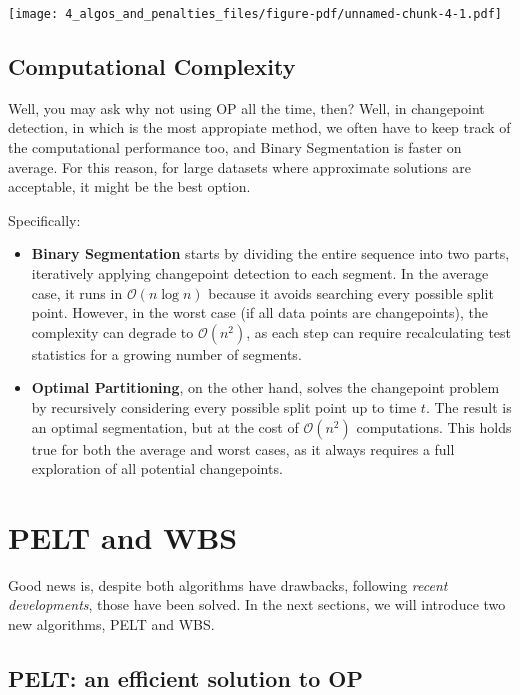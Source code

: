 \documentclass[
  letterpaper,
  DIV=11,
  numbers=noendperiod]{scrreprt}
\begin{document}
\texttt{[image: 4\_algos\_and\_penalties\_files/figure-pdf/unnamed-chunk-4-1.pdf]}

\subsection{Computational Complexity}\label{computational-complexity}

Well, you may ask why not using OP all the time, then? Well, in
changepoint detection, in which is the most appropiate method, we often
have to keep track of the computational performance too, and Binary
Segmentation is faster on average. For this reason, for large datasets
where approximate solutions are acceptable, it might be the best option.

Specifically:

\begin{itemize}
\item
  \textbf{Binary Segmentation} starts by dividing the entire sequence
  into two parts, iteratively applying changepoint detection to each
  segment. In the average case, it runs in \(\mathcal{O}(n \log n)\)
  because it avoids searching every possible split point. However, in
  the worst case (if all data points are changepoints), the complexity
  can degrade to \(\mathcal{O}(n^2)\), as each step can require
  recalculating test statistics for a growing number of segments.
\item
  \textbf{Optimal Partitioning}, on the other hand, solves the
  changepoint problem by recursively considering every possible split
  point up to time \(t\). The result is an optimal segmentation, but at
  the cost of \(\mathcal{O}(n^2)\) computations. This holds true for
  both the average and worst cases, as it always requires a full
  exploration of all potential changepoints.
\end{itemize}

\section{PELT and WBS}\label{pelt-and-wbs}

Good news is, despite both algorithms have drawbacks, following
\emph{recent developments}, those have been solved. In the next
sections, we will introduce two new algorithms, PELT and WBS.

\subsection{PELT: an efficient solution to
OP}\label{pelt-an-efficient-solution-to-op}
\end{document}
